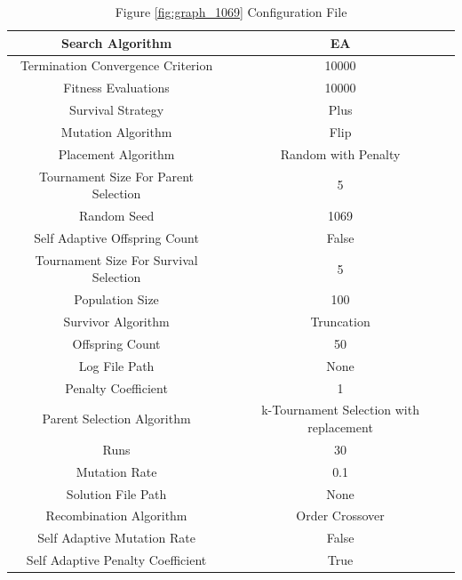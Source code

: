 \documentclass{standalone}
\begin{document}
\begin{table}[!htb]
	\centering
	\caption{Figure \ref{fig:graph_1069} Configuration File}
	\label{tab:graph_1069}
	\begin{tabular}{| c | c |}
		\hline
		Search Algorithm		& EA		 \\
		\hline
		Termination Convergence Criterion		& 10000		 \\
		\hline
		Fitness Evaluations		& 10000		 \\
		\hline
		Survival Strategy		& Plus		 \\
		\hline
		Mutation Algorithm		& Flip		 \\
		\hline
		Placement Algorithm		& Random with Penalty		 \\
		\hline
		Tournament Size For Parent Selection		& 5		 \\
		\hline
		Random Seed		& 1069		 \\
		\hline
		Self Adaptive Offspring Count		& False		 \\
		\hline
		Tournament Size For Survival Selection		& 5		 \\
		\hline
		Population Size		& 100		 \\
		\hline
		Survivor Algorithm		& Truncation		 \\
		\hline
		Offspring Count		& 50		 \\
		\hline
		Log File Path		& None		 \\
		\hline
		Penalty Coefficient		& 1		 \\
		\hline
		Parent Selection Algorithm		& k-Tournament Selection with replacement		 \\
		\hline
		Runs		& 30		 \\
		\hline
		Mutation Rate		& 0.1		 \\
		\hline
		Solution File Path		& None		 \\
		\hline
		Recombination Algorithm		& Order Crossover		 \\
		\hline
		Self Adaptive Mutation Rate		& False		 \\
		\hline
		Self Adaptive Penalty Coefficient		& True		 \\
		\hline
	\end{tabular}
\end{table}
\end{document}
